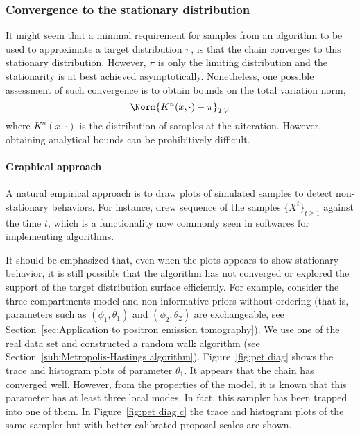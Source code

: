 \subsubsection{Convergence to the stationary distribution}
\label{ssub:Convergence to the stationary distribution}

It might seem that a minimal requirement for samples from an \mcmc algorithm
to be used to approximate a target distribution $\pi$, is that the chain
converges to this stationary distribution. However, $\pi$ is only the limiting
distribution and the stationarity is at best achieved asymptotically.
Nonetheless, one possible assessment of such convergence is to obtain bounds
on the total variation norm,
\begin{equation*}
  \Norm{K^n(x,\cdot)-\pi}_{TV}
\end{equation*}
where $K^n(x,\cdot)$ is the distribution of samples at the $n$\xth iteration.
However, obtaining analytical bounds can be prohibitively difficult.

\paragraph{Graphical approach}

A natural empirical approach is to draw plots of simulated samples to detect
non-stationary behaviors. For instance, \cite{Gelfand:1990it} drew sequence
of the samples $\{X^t\}_{t\ge1}$ against the time $t$, which is a
functionality now commonly seen in softwares for implementing \mcmc
algorithms.

It should be emphasized that, even when the plots appears to show stationary
behavior, it is still possible that the algorithm has not converged or
explored the support of the target distribution surface efficiently. For
example, consider the three-compartments \pet model and non-informative
priors without ordering (that is, parameters such as $(\phi_1,\theta_1)$ and
$(\phi_2,\theta_2)$ are exchangeable, see Section~\ref{sec:Application to
positron emission tomography}). We use one of the real data set and
constructed a random walk algorithm (see Section~\ref{sub:Metropolis-Hastings
algorithm}). Figure~\ref{fig:pet diag} shows the trace and histogram plots of
parameter $\theta_1$. It appears that the \mcmc chain has converged well.
However, from the properties of the model, it is known that this parameter
has at least three local modes. In fact, this sampler has been trapped into
one of them. In Figure~\ref{fig:pet diag c} the trace and histogram plots of
the same sampler but with better calibrated proposal scales are shown.


